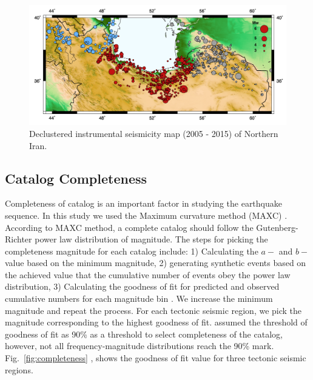 \begin{figure} [ht]
\centering
\includegraphics[scale=0.6]{figures/pdf/Figure02.pdf} 
\caption{Declustered instrumental seismicity map (2005 - 2015) of Northern Iran.}
\label{fig:seismicity}
\end{figure}


\subsection{Catalog Completeness}
\noindent
Completeness of catalog is an important factor in studying the earthquake sequence.  In this study we used the Maximum curvature method (MAXC) \citep{Wiemer2000}. According to MAXC method, a complete catalog should follow the Gutenberg-Richter power law distribution of magnitude. The steps for picking the completeness magnitude for each catalog include: 1) Calculating the $a-$ and $b-$ value based on the minimum magnitude, 2) generating  synthetic events based on the achieved value that the cumulative number of events obey the power law distribution, 3) Calculating the goodness of fit for predicted and observed cumulative numbers for each magnitude bin \citep{Wiemer2000}. We increase the minimum magnitude and repeat the process. For each tectonic seismic region, we pick the magnitude corresponding to the highest goodness of fit.  \citet{Wiemer2000} assumed the threshold of goodness of fit as 90\% as a threshold to select completeness of the catalog, however,  not all frequency-magnitude distributions reach the 90\% mark. Fig.~\ref{fig:completeness} , shows the goodness of fit value for three tectonic seismic regions. 

